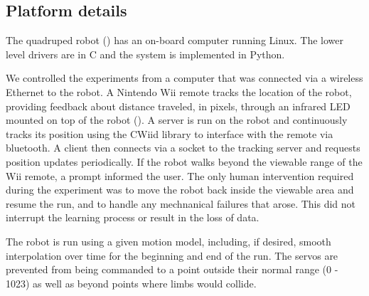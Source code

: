 \subsection{Platform details}












The quadruped robot () has an on-board computer running Linux. The lower
level drivers are in C and the system is implemented in
Python. 


We controlled the experiments from a computer that was connected via a
wireless Ethernet to the robot. A Nintendo Wii remote tracks the location 
of the robot, providing feedback
about distance traveled, in pixels, through an infrared LED mounted on top of 
the robot (). A server is run on the robot and continuously tracks its
position using the CWiid library\cite{cwiid} to interface with the remote
via bluetooth. A client then connects via a socket to the tracking
server and requests position updates periodically. If the robot walks 
beyond the viewable range of the Wii remote, a prompt informed the
user. The only human intervention required during the
experiment was to move the robot back inside the viewable area and resume
the run, and to handle any mechnanical failures that arose. This did not
interrupt the learning process or result in the loss of data.

The robot is run using a given motion model, including, if desired, 
smooth interpolation over time for the beginning and end of the run. 
The servos are prevented from being commanded to a point outside their
normal range (0 - 1023) as well as beyond points where limbs would collide.
